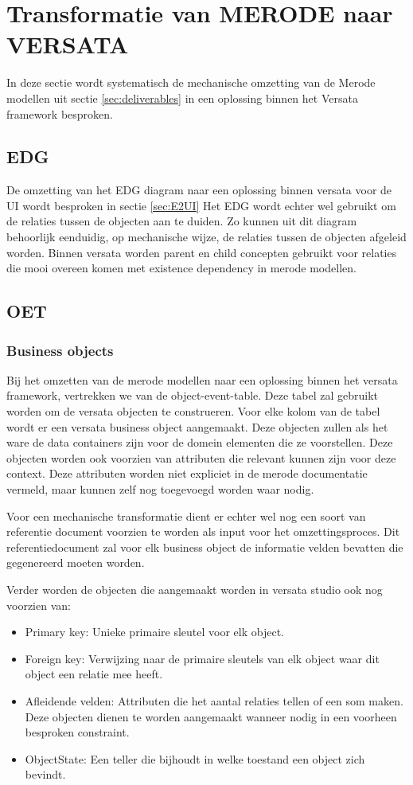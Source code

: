 \section{Transformatie van MERODE naar VERSATA}
\label{sec:mech_transform}
In deze sectie wordt systematisch de mechanische omzetting van de Merode modellen uit sectie \ref{sec:deliverables} in een oplossing binnen het Versata framework besproken.
\subsection{EDG}
De omzetting van het EDG diagram naar een oplossing binnen versata voor de UI wordt besproken in sectie \ref{sec:E2UI}
Het EDG wordt echter wel gebruikt om de relaties tussen de objecten aan te duiden. Zo kunnen uit dit diagram behoorlijk eenduidig, op mechanische wijze, 
de relaties tussen de objecten afgeleid worden. Binnen versata worden parent en child concepten gebruikt voor relaties die mooi overeen komen met existence dependency in merode modellen.

\subsection{OET}
\label{sec:OET}
\subsubsection{Business objects}
Bij het omzetten van de merode modellen naar een oplossing binnen het versata framework, vertrekken we van de object-event-table. Deze tabel zal gebruikt worden om de versata objecten te construeren.
Voor elke kolom van de tabel wordt er een versata business object aangemaakt. 
Deze objecten zullen als het ware de data containers zijn voor de domein elementen die ze voorstellen. Deze objecten worden ook voorzien van attributen die relevant kunnen zijn voor deze context. Deze attributen worden niet expliciet in de merode documentatie vermeld, maar kunnen zelf nog toegevoegd worden waar nodig.

Voor een mechanische transformatie dient er echter wel nog een soort van referentie document voorzien te worden als input voor het omzettingsproces. 
Dit referentiedocument zal voor elk business object de informatie velden bevatten die gegenereerd moeten worden.

Verder worden de objecten die aangemaakt worden in versata studio ook nog voorzien van: 
\begin{itemize}
	\item Primary key: Unieke primaire sleutel voor elk object.
	\item Foreign key: Verwijzing naar de primaire sleutels van elk object waar dit object een relatie mee heeft.
	\item Afleidende velden: Attributen die het aantal relaties tellen of een som maken. Deze objecten dienen te worden aangemaakt wanneer nodig in een voorheen besproken constraint.
	\item ObjectState: Een teller die bijhoudt in welke toestand een object zich bevindt.
\end{itemize}
